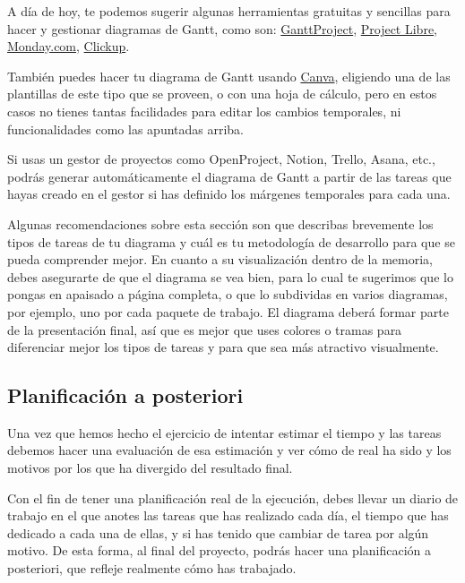 A día de hoy, te podemos sugerir algunas herramientas gratuitas y sencillas para hacer y gestionar diagramas de Gantt, como son: \href{https://www.ganttproject.biz/}{GanttProject}, \href{https://www.projectlibre.com/}{Project Libre}, 
 \href{https://www.monday.com}{Monday.com}, \href{https://app.clickup.com/}{Clickup}. 

También puedes hacer tu diagrama de Gantt usando \href{https://www.canva.com/}{Canva}, eligiendo una de las plantillas de este tipo que se proveen, o con una hoja de cálculo, pero en estos casos no tienes tantas facilidades para editar los cambios temporales, ni funcionalidades como las apuntadas arriba. 

Si usas un gestor de proyectos como OpenProject, Notion, Trello, Asana, etc., podrás generar automáticamente el diagrama de Gantt a partir de las tareas que hayas creado en el gestor si has definido los márgenes temporales para cada una.

Algunas recomendaciones sobre esta sección son que describas brevemente los tipos de tareas de tu diagrama y cuál es tu metodología de desarrollo para que se pueda comprender mejor. En cuanto a su visualización dentro de la memoria, debes asegurarte de que el diagrama se vea bien, para lo cual te sugerimos que lo pongas en apaisado a página completa, o que lo subdividas en varios diagramas, por ejemplo, uno por cada paquete de trabajo. El diagrama deberá formar parte de la presentación final, así que es mejor que uses colores o tramas para diferenciar mejor los tipos de tareas y para que sea más atractivo visualmente. 

\subsection{Planificación a posteriori}

Una vez que hemos hecho el ejercicio de intentar estimar el tiempo y las tareas debemos hacer una evaluación de esa estimación y ver cómo de real ha sido y los motivos por los que ha divergido del resultado final.

Con el fin de tener una planificación real de la ejecución, debes llevar un diario de trabajo en el que anotes las tareas que has realizado cada día, el tiempo que has dedicado a cada una de ellas, y si has tenido que cambiar de tarea por algún motivo. De esta forma, al final del proyecto, podrás hacer una planificación a posteriori, que refleje realmente cómo has trabajado. 



